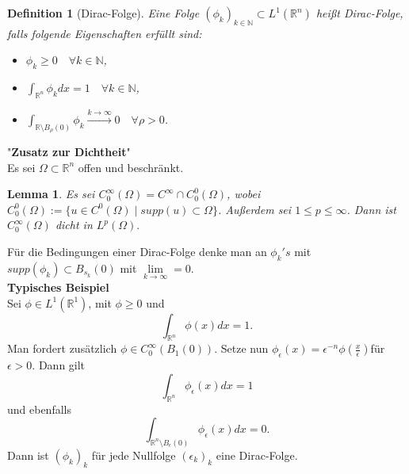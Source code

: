 \documentclass[12pt,titlepage]{article}
\newtheorem{definition}[zahl]{Definition}
\newtheorem{lemma}[zahl]{Lemma}
\numberwithin{equation}{section}
\begin{document}
\begin{definition}[Dirac-Folge]
Eine Folge $(\phi_k)_{k \in\mathbb{N}} \subset L^1(\mathbb{R}^n)$ heißt Dirac-Folge, falls folgende Eigenschaften erfüllt sind:
\begin{itemize}
\item $\phi_k\geq 0 \quad \forall k\in \mathbb{N}$,
\item $\int_{\mathbb{R}^n}\phi_k dx=1 \quad \forall k \in \mathbb{N}$,
\item $\int_{\mathbb{R}\setminus B_{\rho}(0)}\phi_k \overset{k \rightarrow \infty }{\rightarrow}0 \quad \forall \rho > 0$.
\end{itemize}
\end{definition}
"\textbf{Zusatz zur Dichtheit}"\\
Es sei $\Omega \subset \mathbb{R}^n$ offen und beschränkt.
\begin{lemma}
Es sei $C_0^{\infty} (\Omega)=C^{\infty}\cap C_0^0(\Omega)$,
 wobei $C^0_0(\Omega):=\{u \in C^0(\Omega)\mid supp(u) \subset \Omega\}$.
 Außerdem sei $1 \leq p \leq \infty$. Dann ist $C^{\infty}_0(\Omega)$ dicht in $L^p(\Omega).$
\end{lemma}
Für die Bedingungen einer Dirac-Folge denke man an $\phi_k's$ mit $supp(\phi_k)\subset B_{s_k}(0)$ mit $\underset{k \rightarrow \infty}{\lim} =0.$\\
\textbf{Typisches Beispiel}\\
Sei $\phi \in L^1(\mathbb{R}^1)$, mit $\phi \geq 0$ und 
\[ 
\int_{\mathbb{R}^n}\phi(x)dx =1.
\]
Man fordert zusätzlich $\phi \in C^{\infty}_0(B_1(0))$. Setze nun $\phi_{\epsilon}(x)=\epsilon^{-n}\phi(\frac{x}{\epsilon})$für $\epsilon >0 .$ Dann gilt 
\[
\int_{\mathbb{R}^n}\phi_{\epsilon}(x)dx =1
\]und ebenfalls
\[
\int_{\mathbb{R}^n\setminus B_{\epsilon}(0)}\phi_{\epsilon}(x)dx =0.
\]
Dann ist $(\phi_k)_k$ für jede Nullfolge $(\epsilon_k)_k$ eine Dirac-Folge.
\end{document}
